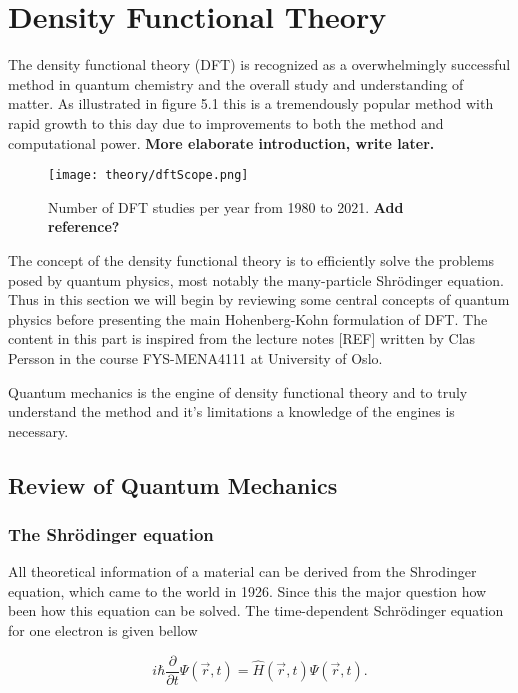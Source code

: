 \chapter{Density Functional Theory}
\label{sec:DFT}

The density functional theory (DFT) is recognized as a overwhelmingly successful method in quantum chemistry and the overall study and understanding of matter. As illustrated in figure 5.1 this is a tremendously popular method with rapid growth to this day due to improvements to both the method and computational power. \textbf{More elaborate introduction, write later.}
\begin{figure}[H]
\texttt{[image: theory/dftScope.png]}
\caption{Number of DFT studies per year from 1980 to 2021. \textbf{Add reference?}}
\end{figure}

The concept of the density functional theory is to efficiently solve the problems posed by quantum physics, most notably the many-particle Shr\"{o}dinger equation. Thus in this section we will begin by reviewing some central concepts of quantum physics before presenting the main Hohenberg-Kohn formulation of DFT. The content in this part is inspired from the lecture notes [REF] written by Clas Persson in the course FYS-MENA4111 at University of Oslo.

Quantum mechanics is the engine of density functional theory and to truly understand the method and it's limitations a knowledge of the engines is necessary. 
\section{Review of Quantum Mechanics}

\subsection{The Shr\"{o}dinger equation}
All theoretical information of a material can be derived from the Shrodinger equation, which came to the world in 1926. Since this the major question how been how this equation can be solved. 
The time-dependent Schr\"{o}dinger equation for one electron is given bellow

\begin{equation}
    i\hbar\frac{\partial}{\partial t}\Psi(\vec{r}, t) = \hat{H}(\vec{r},t)\Psi(\vec{r}, t).
\end{equation}

